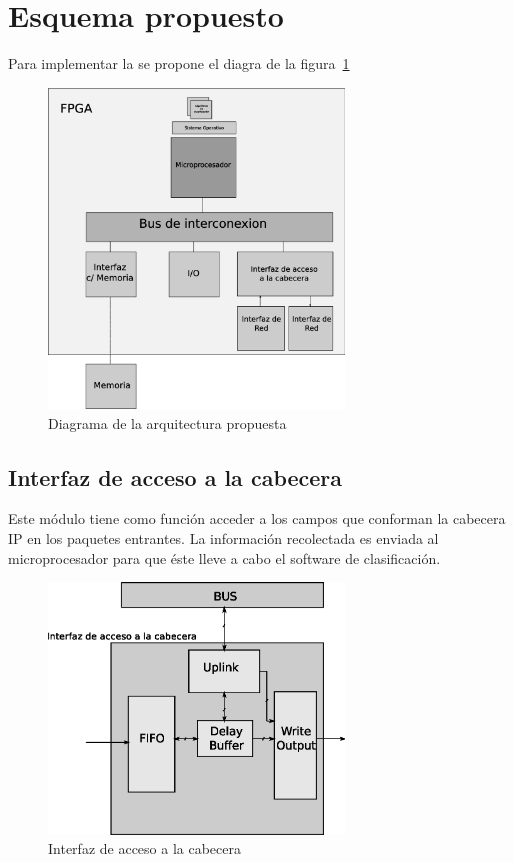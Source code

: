 \section{Esquema propuesto}
Para implementar la se propone el diagra de la figura~\ref{fig:solucion}
 \begin{figure}[h]
  \centering
	 \includegraphics[width=0.7\textwidth]{2-sistema/graf/solucion.eps}
  \caption{Diagrama de la arquitectura propuesta}
  \label{fig:solucion}
\end{figure}

\subsection{Interfaz de acceso a la cabecera}
Este módulo tiene como función acceder a los campos que conforman la cabecera IP en los paquetes entrantes. La información recolectada es enviada al microprocesador para que éste lleve a cabo el software de clasificación.

\newpage

 \begin{figure}[h]
  \centering
	 \includegraphics[width=0.7\textwidth]{2-sistema/graf/modulo.eps}
  \caption{Interfaz de acceso a la cabecera}
  \label{fig:inter}
\end{figure}



